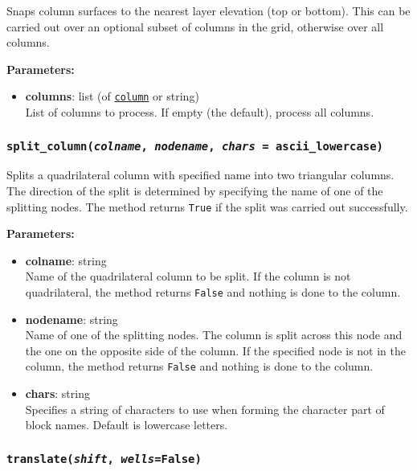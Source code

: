Snaps column surfaces to the nearest layer elevation (top or bottom). This can be carried out over an optional subset of columns in the grid, otherwise over all columns.

\textbf{Parameters:}
\begin{itemize}
\item \textbf{columns}: list (of \hyperref[columnobjects]{\texttt{column}} or string)\\
  List of columns to process.  If empty (the default), process all columns.
\end{itemize}

\begin{snugshade}\subsubsection{\texttt{split\_column(\emph{colname}, \emph{nodename}, \emph{chars} = ascii\_lowercase)}}\end{snugshade}
\label{sec:mulgrid:split_column}

Splits a quadrilateral column with specified name into two triangular columns.  The direction of the split is determined
by specifying the name of one of the splitting nodes.  The method returns \texttt{True} if the split was carried out successfully.

\textbf{Parameters:}
\begin{itemize}
\item \textbf{colname}: string\\
  Name of the quadrilateral column to be split.  If the column is not quadrilateral, the method returns \texttt{False} and nothing is done to the column.
\item \textbf{nodename}: string\\
  Name of one of the splitting nodes.  The column is split across this node and the one on the opposite side of the column.  If the specified node is not in the column, the method returns \texttt{False} and nothing is done to the column.
\item \textbf{chars}: string\\
  Specifies a string of characters to use when forming the character part of block names.  Default is lowercase letters.
\end{itemize}

\begin{snugshade}\subsubsection{\texttt{translate(\emph{shift}, \emph{wells}=\texttt{False})}}\end{snugshade}
\label{sec:mulgrid:translate}

